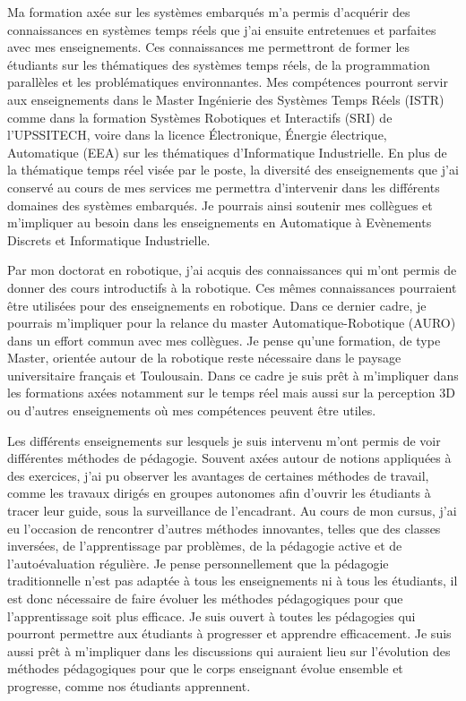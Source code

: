Ma formation axée sur les systèmes embarqués m'a permis d'acquérir des connaissances en systèmes temps réels que j'ai ensuite entretenues et parfaites avec mes enseignements. Ces connaissances me permettront de former les étudiants sur les thématiques des systèmes temps réels, de la programmation parallèles et les problématiques environnantes. Mes compétences pourront servir aux enseignements dans le Master Ingénierie des Systèmes Temps Réels (ISTR) comme dans la formation Systèmes Robotiques et Interactifs (SRI) de l'UPSSITECH, voire dans la licence Électronique, Énergie électrique, Automatique (EEA) sur les thématiques d'Informatique Industrielle. En plus de la thématique temps réel visée par le poste, la diversité des enseignements que j'ai conservé au cours de mes services me permettra d'intervenir dans les différents domaines des systèmes embarqués. Je pourrais ainsi soutenir mes collègues et m'impliquer au besoin dans les enseignements en Automatique à Evènements Discrets et Informatique Industrielle. 

Par mon doctorat en robotique, j'ai acquis des connaissances qui m'ont permis de donner des cours introductifs à la robotique. Ces mêmes connaissances pourraient être utilisées pour des enseignements en robotique. Dans ce dernier cadre, je pourrais m'impliquer pour la relance du master Automatique-Robotique (AURO) dans un effort commun avec mes collègues. Je pense qu'une formation, de type Master, orientée autour de la robotique reste nécessaire dans le paysage universitaire français et Toulousain. Dans ce cadre je suis prêt à m'impliquer dans les formations axées notamment sur le temps réel mais aussi sur la perception 3D ou d'autres enseignements où mes compétences peuvent être utiles.

Les différents enseignements sur lesquels je suis intervenu m'ont permis de voir différentes méthodes de pédagogie. Souvent axées autour de notions appliquées à des exercices, j'ai pu observer les avantages de certaines méthodes de travail, comme les travaux dirigés en groupes autonomes afin d'ouvrir les étudiants à tracer leur guide, sous la surveillance de l'encadrant. Au cours de mon cursus, j'ai eu l'occasion de rencontrer d'autres méthodes innovantes, telles que des classes inversées, de l'apprentissage par problèmes, de la pédagogie active et de l'autoévaluation régulière. Je pense personnellement que la pédagogie traditionnelle n'est pas adaptée à tous les enseignements ni à tous les étudiants, il est donc nécessaire de faire évoluer les méthodes pédagogiques pour que l'apprentissage soit plus efficace. Je suis ouvert à toutes les pédagogies qui pourront permettre aux étudiants à progresser et apprendre efficacement. Je suis aussi prêt à m'impliquer dans les discussions qui auraient lieu sur l'évolution des méthodes pédagogiques pour que le corps enseignant évolue ensemble et progresse, comme nos étudiants apprennent.

